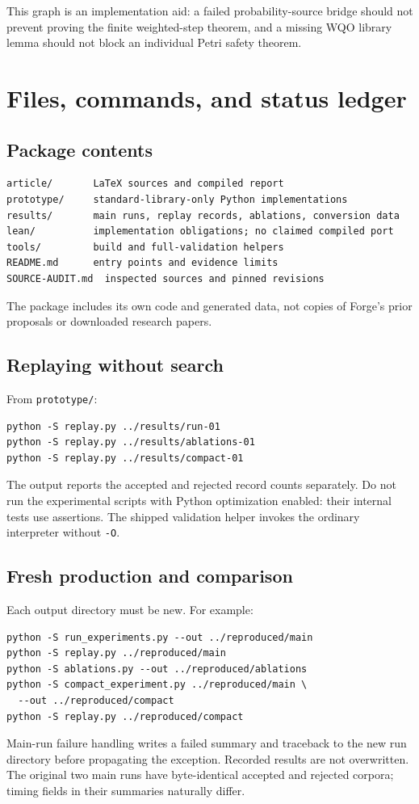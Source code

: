 \documentclass[11pt,a4paper]{article}
\theoremstyle{definition}\newtheorem{definition}[theorem]{Definition}
\theoremstyle{remark}\newtheorem{remark}[theorem]{Remark}
\newcommand{\code}[1]{\nolinkurl{#1}}
\begin{document}
This graph is an implementation aid: a failed probability-source bridge should not prevent proving the finite weighted-step theorem, and a missing WQO library lemma should not block an individual Petri safety theorem.



\section{Files, commands, and status ledger}
\subsection{Package contents}
\begin{lstlisting}
article/       LaTeX sources and compiled report
prototype/     standard-library-only Python implementations
results/       main runs, replay records, ablations, conversion data
lean/          implementation obligations; no claimed compiled port
tools/         build and full-validation helpers
README.md      entry points and evidence limits
SOURCE-AUDIT.md  inspected sources and pinned revisions
\end{lstlisting}
The package includes its own code and generated data, not copies of Forge's prior proposals or downloaded research papers.

\subsection{Replaying without search}
From \code{prototype/}:
\begin{lstlisting}
python -S replay.py ../results/run-01
python -S replay.py ../results/ablations-01
python -S replay.py ../results/compact-01
\end{lstlisting}
The output reports the accepted and rejected record counts separately. Do not run the experimental scripts with Python optimization enabled: their internal tests use assertions. The shipped validation helper invokes the ordinary interpreter without \code{-O}.

\subsection{Fresh production and comparison}
Each output directory must be new. For example:
\begin{lstlisting}
python -S run_experiments.py --out ../reproduced/main
python -S replay.py ../reproduced/main
python -S ablations.py --out ../reproduced/ablations
python -S compact_experiment.py ../reproduced/main \
  --out ../reproduced/compact
python -S replay.py ../reproduced/compact
\end{lstlisting}
Main-run failure handling writes a failed summary and traceback to the new run directory before propagating the exception. Recorded results are not overwritten. The original two main runs have byte-identical accepted and rejected corpora; timing fields in their summaries naturally differ.
\end{document}
